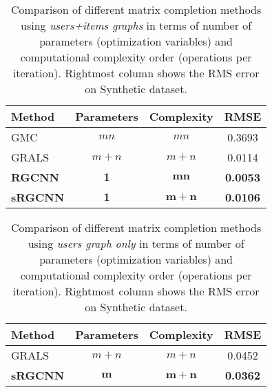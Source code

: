 \documentclass{article}
\begin{document}
\begin{table}[!ht]
\caption{
Comparison of different matrix completion methods using {\it users+items graphs} in terms of number of parameters (optimization variables) and computational complexity order (operations per iteration). Rightmost column shows the RMS error on Synthetic dataset. 
}
\label{tab:results-synthetic-netflix}
\vskip 0.15in
\begin{center}
\begin{small}
\begin{sc}
\begin{tabular}{lccc}
\hline
\abovespace\belowspace
Method & Parameters & Complexity & RMSE\\
\hline
\abovespace
GMC   & $m n $ & $m n$ & 0.3693   \\
GRALS & $m+n$ & $m+n$ & 0.0114 \\
{\bf RGCNN}    & $\mathbf{1}$ & $\mathbf{m n}$ & {\bf 0.0053} \\
{\bf  sRGCNN}  & $\mathbf{1}$ &$\mathbf{m+n}$ & {\bf 0.0106} \\
\hline
\end{tabular}
\end{sc}
\end{small}
\end{center}
\vskip -0.1in
\end{table}

\begin{table}[!ht]
\caption{Comparison of different matrix completion methods using {\it users graph only} in terms of number of parameters (optimization variables) and computational complexity order (operations per iteration). Rightmost column shows the RMS error on Synthetic dataset.}
\label{tab:results-synthetic-netflix-one-graph}
\vskip 0.15in
\begin{center}
\begin{small}
\begin{sc}
\begin{tabular}{lccc}
\hline
\abovespace\belowspace
Method & Parameters & Complexity & RMSE \\
\hline
\abovespace
GRALS & $m+n$ & $m+n$  & 0.0452 \\
{\bf sRGCNN} & $\mathbf{m}$ & $\mathbf{m+n}$ & {\bf 0.0362}\\
\hline
\end{tabular}
\end{sc}
\end{small}
\end{center}
\vskip -0.1in
\end{table}
\end{document}
